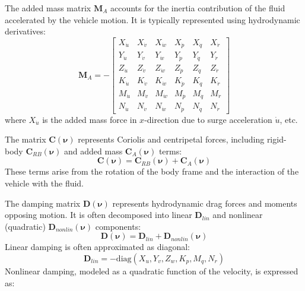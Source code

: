 The added mass matrix $\mathbf{M}_A$ accounts for the inertia contribution of the fluid accelerated by the vehicle motion. It is typically represented using hydrodynamic derivatives:
\begin{equation}
    \mathbf{M}_{A} = -
    \begin{bmatrix}
        X_{\dot{u}} & X_{\dot{v}} & X_{\dot{w}} & X_{\dot{p}} & X_{\dot{q}} & X_{\dot{r}} \\
        Y_{\dot{u}} & Y_{\dot{v}} & Y_{\dot{w}} & Y_{\dot{p}} & Y_{\dot{q}} & Y_{\dot{r}} \\
        Z_{\dot{u}} & Z_{\dot{v}} & Z_{\dot{w}} & Z_{\dot{p}} & Z_{\dot{q}} & Z_{\dot{r}} \\
        K_{\dot{u}} & K_{\dot{v}} & K_{\dot{w}} & K_{\dot{p}} & K_{\dot{q}} & K_{\dot{r}} \\
        M_{\dot{u}} & M_{\dot{v}} & M_{\dot{w}} & M_{\dot{p}} & M_{\dot{q}} & M_{\dot{r}} \\
        N_{\dot{u}} & N_{\dot{v}} & N_{\dot{w}} & N_{\dot{p}} & N_{\dot{q}} & N_{\dot{r}}
    \end{bmatrix}
\end{equation}
where $X_{\dot{u}}$ is the added mass force in $x$-direction due to surge acceleration $\dot{u}$, etc.

The matrix $\mathbf{C}(\boldsymbol{\nu})$ represents Coriolis and centripetal forces, including rigid-body $\mathbf{C}_{RB}(\boldsymbol{\nu})$ and added mass $\mathbf{C}_A(\boldsymbol{\nu})$ terms:
\begin{equation}
    \mathbf{C}(\boldsymbol{\nu}) = \mathbf{C}_{RB}(\boldsymbol{\nu}) + \mathbf{C}_A(\boldsymbol{\nu})
\end{equation}
These terms arise from the rotation of the body frame and the interaction of the vehicle with the fluid.

The damping matrix $\mathbf{D}(\boldsymbol{\nu})$ represents hydrodynamic drag forces and moments opposing motion. It is often decomposed into linear $\mathbf{D}_{lin}$ and nonlinear (quadratic) $\mathbf{D}_{nonlin}(\boldsymbol{\nu})$ components:
\begin{equation}
    \mathbf{D}(\boldsymbol{\nu}) = \mathbf{D}_{lin} + \mathbf{D}_{nonlin}(\boldsymbol{\nu})
\end{equation}
Linear damping is often approximated as diagonal:
\begin{equation}
    \mathbf{D}_{lin} = -\text{diag}(X_u, Y_v, Z_w, K_p, M_q, N_r)
\end{equation}
Nonlinear damping, modeled as a quadratic function of the velocity, is expressed as:



